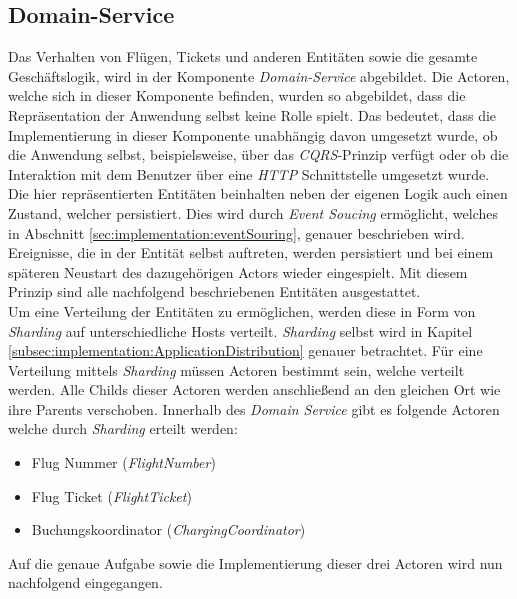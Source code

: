 \subsection{Domain-Service}
\label{subsec:implementation:domainService} 
Das Verhalten von Flügen, Tickets und anderen Entitäten sowie die gesamte Geschäftslogik, wird in der Komponente \textit{Domain-Service} abgebildet. Die Actoren, welche sich in dieser Komponente befinden, wurden so abgebildet, dass die Repräsentation der Anwendung selbst keine Rolle spielt. Das bedeutet, dass die Implementierung in dieser Komponente unabhängig davon umgesetzt wurde, ob die Anwendung selbst, beispielsweise, über das \textit{CQRS}-Prinzip verfügt oder ob die Interaktion mit dem Benutzer über eine \textit{HTTP} Schnittstelle umgesetzt wurde. \\
Die hier repräsentierten Entitäten beinhalten neben der eigenen Logik auch einen Zustand, welcher persistiert. Dies wird durch \textit{Event Soucing} ermöglicht, welches in Abschnitt \ref{sec:implementation:eventSouring}, genauer beschrieben wird. Ereignisse, die in der Entität selbst auftreten, werden persistiert und bei einem späteren Neustart des dazugehörigen Actors wieder eingespielt. Mit diesem Prinzip sind alle nachfolgend beschriebenen Entitäten ausgestattet. \\
Um eine Verteilung der Entitäten zu ermöglichen, werden diese in Form von \textit{Sharding} auf unterschiedliche Hosts verteilt. \textit{Sharding} selbst wird in Kapitel \ref{subsec:implementation:ApplicationDistribution} genauer betrachtet. Für eine Verteilung mittels \textit{Sharding} müssen Actoren bestimmt sein, welche verteilt werden. Alle Childs dieser Actoren werden anschließend an den gleichen Ort wie ihre Parents verschoben. Innerhalb des \textit{Domain Service} gibt es folgende Actoren welche durch \textit{Sharding} erteilt werden:
\begin{itemize}
    \item Flug Nummer (\textit{FlightNumber})
    \item Flug Ticket (\textit{FlightTicket})
    \item Buchungskoordinator (\textit{ChargingCoordinator})
\end{itemize}
Auf die genaue Aufgabe sowie die Implementierung dieser drei Actoren wird nun nachfolgend eingegangen.

